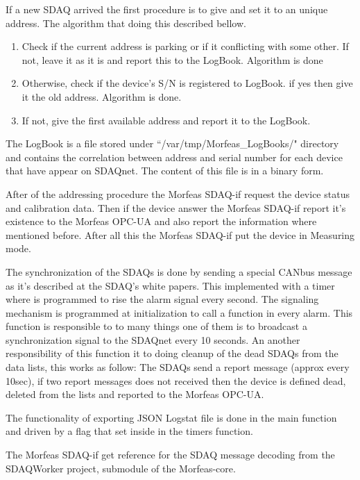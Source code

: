 If a new SDAQ arrived the first procedure is to give and set it to an unique address. The algorithm that doing this described bellow.
\begin{enumerate}
	\item Check if the current address is parking or if it conflicting with some other. If not, leave it as it is and report this to the LogBook. Algorithm is done
	\item Otherwise, check if the device's S/N is registered to LogBook. if yes then give it the old address. Algorithm is done.
	\item If not, give the first available address and report it to the LogBook.
\end{enumerate}
The LogBook is a file stored under ``/var/tmp/Morfeas\_LogBooks/" directory and contains the correlation between address and serial number for each device that have appear on SDAQnet.
The content of this file is in a binary form.

After of the addressing procedure the Morfeas SDAQ-if request the device status and calibration data. Then if the device answer the Morfeas SDAQ-if report it's existence to the Morfeas OPC-UA
and also report the information where mentioned before. After all this the Morfeas SDAQ-if put the device in Measuring mode.

The synchronization of the SDAQs is done by sending a special CANbus message as it's described at the SDAQ's white papers. This implemented with a timer where is programmed to rise the alarm signal every second.
The signaling mechanism is programmed at initialization to call a function in every alarm. This function is responsible to to many things one of them is to broadcast a synchronization signal to the SDAQnet every 10 seconds.
An another responsibility of this function it to doing cleanup of the dead SDAQs from the data lists, this works as follow: The SDAQs send a report message (approx every 10sec),
if two report messages does not received then the device is defined dead, deleted from the lists and reported to the Morfeas OPC-UA.

The functionality of exporting JSON Logstat file is done in the main function and driven by a flag that set inside in the timers function.

The Morfeas SDAQ-if get reference for the SDAQ message decoding from the SDAQWorker project, submodule of the Morfeas-core.

